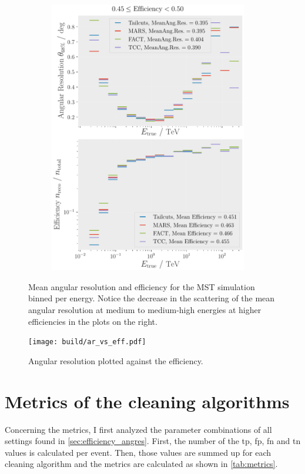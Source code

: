 \begin{figure}
\begin{subfigure}{0.48\textwidth}
        \includegraphics[width=0.95\textwidth]{plots/ar_aeff/AR_Aeff_MST_0.45_0.50.pdf}
    \end{subfigure}
    \caption{Mean angular resolution and efficiency for the MST simulation binned per energy. Notice
    the decrease in the scattering of the mean angular resolution at medium to
    medium-high energies at higher efficiencies in the plots on the right.}
    \label{fig:efficiency_angres}
\end{figure}
\begin{figure}
    \centering
    \texttt{[image: build/ar\_vs\_eff.pdf]}
    \caption{Angular resolution plotted against the efficiency.}
    \label{fig:ar_vs_eff}
\end{figure}


\section{Metrics of the cleaning algorithms}
\label{sec:metrics}
Concerning the metrics, I first analyzed the parameter combinations of all settings found in \autoref{sec:efficiency_angres}. First,
the number of the \gls{tp}, \gls{fp}, \gls{fn} and \gls{tn} values is calculated per event. Then,
those values are summed up for each cleaning algorithm and the metrics are calculated as shown in
\autoref{tab:metrics}.


